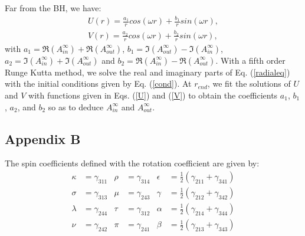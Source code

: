 \documentclass[twocolumn,amsmath,amssymb,prl,10pt,nofootinbib,superscriptaddress]{revtex4}
\def\bea{\begin{eqnarray}}
\def\eea{\end{eqnarray}}
\begin{document}
\noindent Far from the BH, we have:
\bea
 U(r)= \frac{a_1}{r} cos(\omega r)+ \frac{b_1}{r} sin(\omega r),  \label{U} \\
 V(r)= \frac{a_2}{r} cos(\omega r)+ \frac{b_2}{r} sin(\omega r),
 \label{V}
\eea
with $a_1=\Re({A^{\infty}_{in}})+\Re({A^{\infty}_{out}})$, $b_1=\Im({A^{\infty}_{out}})-\Im({A^{\infty}_{in}})$, $a_2=\Im({A^{\infty}_{in}})+\Im({A^{\infty}_{out}})$ and $b_2=\Re({A^{\infty}_{in}})-\Re({A^{\infty}_{out}})$. With a fifth order Runge Kutta method, we solve the real and imaginary parts of Eq. (\ref{radialeq}) with the initial conditions given by Eq. (\ref{cond}). At $r_{end}$, we fit the solutions of $U$ and $V$ with functions given in Eqs. (\ref{U}) and (\ref{V}) to obtain the coefficients $a_1$, $b_1$, $a_2$, and $b_2$ so as to deduce $A^{\infty }_{in}$ and $A^{\infty}_{out}$.





\subsection{Appendix B}

The spin coefficients defined with the rotation coefficient are given by:
  \begin{align*}  
 \kappa &=\gamma  _{311} &  \rho &= \gamma  _{314}  & \epsilon &=\frac{1}{2}( \gamma  _{211} +  \gamma  _{341} ) \\  
 \sigma &= \gamma  _{313} & \mu &= \gamma  _{243}  & \gamma &= \frac{1}{2}( \gamma  _{212} +  \gamma  _{342} )  \\
  \lambda &= \gamma  _{244} &  \tau &= \gamma  _{312}  & \alpha &= \frac{1}{2}( \gamma  _{214} +  \gamma  _{344} )  \\
   \nu &= \gamma  _{242} & \pi &= \gamma  _{241}  & \beta &= \frac{1}{2}( \gamma  _{213} +  \gamma  _{343} ) 
  \end{align*}

 

 
\end{document}
